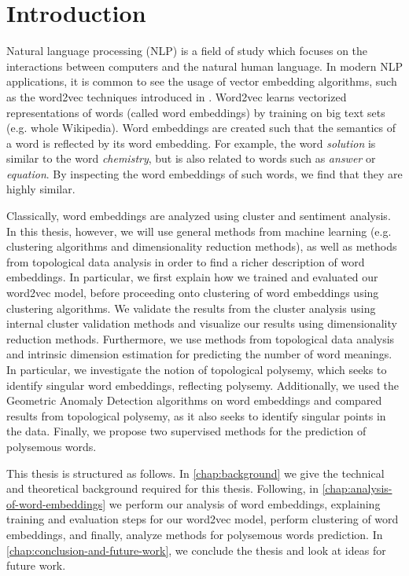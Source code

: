 \chapter{Introduction}
\label{chap:introduction}
Natural language processing (NLP) is a field of study which focuses on the interactions between computers and the natural human language. In modern NLP applications, it is common to see the usage of vector embedding algorithms, such as the word2vec techniques introduced in \cite{mikolov2013a}. Word2vec learns vectorized representations of words (called word embeddings) by training on big text sets (e.g. whole Wikipedia). Word embeddings are created such that the semantics of a word is reflected by its word embedding. For example, the word \textit{solution} is similar to the word \textit{chemistry}, but is also related to words such as \textit{answer} or \textit{equation}. By inspecting the word embeddings of such words, we find that they are highly similar.

Classically, word embeddings are analyzed using cluster and sentiment analysis. In this thesis, however, we will use general methods from machine learning (e.g. clustering algorithms and dimensionality reduction methods), as well as methods from topological data analysis in order to find a richer description of word embeddings. In particular, we first explain how we trained and evaluated our word2vec model, before proceeding onto clustering of word embeddings using clustering algorithms. We validate the results from the cluster analysis using internal cluster validation methods and visualize our results using dimensionality reduction methods. Furthermore, we use methods from topological data analysis and intrinsic dimension estimation for predicting the number of word meanings. In particular, we investigate the notion of topological polysemy, which seeks to identify singular word embeddings, reflecting polysemy. Additionally, we used the Geometric Anomaly Detection algorithms on word embeddings and compared results from topological polysemy, as it also seeks to identify singular points in the data. Finally, we propose two supervised methods for the prediction of polysemous words.

This thesis is structured as follows. In \cref{chap:background} we give the technical and theoretical background required for this thesis. Following, in \cref{chap:analysis-of-word-embeddings} we perform our analysis of word embeddings, explaining training and evaluation steps for our word2vec model, perform clustering of word embeddings, and finally, analyze methods for polysemous words prediction. In \cref{chap:conclusion-and-future-work}, we conclude the thesis and look at ideas for future work.